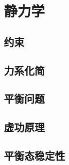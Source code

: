 \chapter{静力学}

\section{约束}

\section{力系化简}

\section{平衡问题}

\section{虚功原理}

\section{}

\section{平衡态稳定性}
